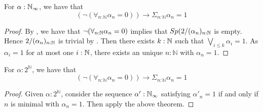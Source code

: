 \begin{theorem}
  For $\alpha:\mathbb{N}_{\infty}$, we have that 
  \begin{equation}
    (\neg (\forall_{n:\mathbb N} \alpha_n= 0)) \to \Sigma_{n:\mathbb N} \alpha_n= 1
  \end{equation}
\end{theorem}
\begin{proof}
  By , we have that $\neg(\forall_{n:\mathbb{N}} \alpha_n = 0)$ implies that 
  $Sp(2/(\alpha_n)_{n:\mathbb{N}}$ is empty. 
  Hence $2/(\alpha_n)_{n:\mathbb{N}}$ is trivial by . 
  Then there exists $k:\mathbb{N}$ such that $\bigvee_{i\leq k} \alpha_i = 1$. 
  As $\alpha_i = 1$ for at most one $i:\mathbb{N}$, 
  there exists an unique $n:\mathbb N$ with $\alpha_n = 1$. 
\end{proof}

\begin{corollary}\label{MarkovPrinciple}
  For $\alpha:2^\mathbb N$, we have that 
  \begin{equation}
    (\neg (\forall_{n:\mathbb N} \alpha_n= 0)) \to \Sigma_{n:\mathbb N} \alpha_n= 1
  \end{equation}
\end{corollary}
\begin{proof}
  Given $\alpha:2^\mathbb N$, consider the sequence $\alpha':\mathbb{N}_{\infty}$ satisfying $\alpha'_n = 1$ if and only if
  $n$ is minimal with $\alpha_n = 1$. Then apply the above theorem.
\end{proof}

